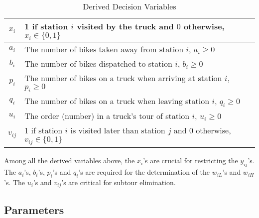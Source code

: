 \documentclass[a4paper, 12pt]{article}%
\theoremstyle{definition}
\begin{document}
    \begin{table}[h!]
        \centering
        \begin{tabular}{c|l}
    	\toprule
           $x_i$ & 1 if station $i$ visited by the truck and $0$ otherwise, $x_i \in \{0,1\}$\\ \hline 
            $a_i$ & The number of bikes taken away from station $i$, $a_i \geq 0$\\
            $b_i$ &  The number of bikes dispatched to station $i$, $b_i \geq 0$\\
            $p_i$ &  The number of bikes on a truck when arriving at station $i$, $p_i \geq 0$\\
            $q_i$ & The number of bikes on a truck when leaving station $i$, $q_i \geq 0$\\ \hline
            $u_i$ & The order (number) in a truck's tour of station $i$, $u_i \geq 0$\\ 
            $v_{ij}$  & 1 if station $i$ is visited later than station $j$ and 0 otherwise, $v_{ij} \in \{0,1\}$\\
    	\bottomrule
        \end{tabular}
        \caption{Derived Decision Variables}
        \label{tab:my_labe1l}
    \end{table}


\noindent Among all the derived variables above, the $x_i$'s are crucial for restricting the $y_{ij}$'s. The $a_i$'s, $b_i$'s, $p_i$'s and $q_i$'s are required for the determination of the $w_{iL}$'s and $w_{iH}$'s. The $u_i$'s and $v_{ij}$'s are critical for subtour elimination. 


\subsection{Parameters}

\end{document}
